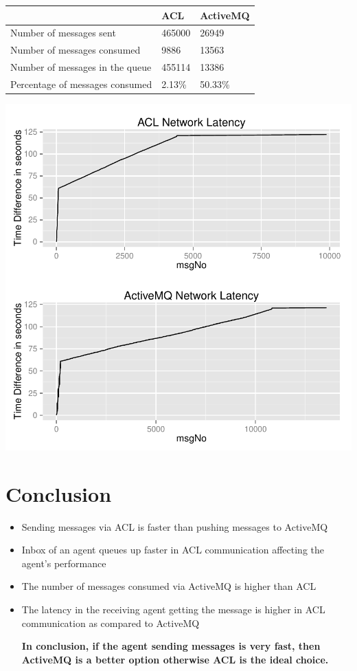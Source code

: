 \documentclass{article}
\begin{document}
\begin{table}[htp]
\begin{center}
\begin{tabular}{|l|l|l|}
\hline
&ACL & ActiveMQ\tabularnewline
\hline
Number of messages sent & 465000 & 26949\tabularnewline
\hline
Number of messages consumed & 9886 & 13563\tabularnewline
\hline
Number of messages in the queue & 455114 & 13386\tabularnewline
\hline
Percentage of messages consumed & 2.13\% & 50.33\%\tabularnewline
\hline
\end{tabular}
\end{center}
\end{table}

\includegraphics{ACLvsActiveMQ_Benchmark-002}
\clearpage

\section{Conclusion}
\begin{itemize}
\item Sending messages via ACL is faster than pushing messages to ActiveMQ
\item Inbox of an agent queues up faster in ACL communication affecting the agent's performance
\item The number of messages consumed via ActiveMQ is higher than ACL
\item The latency in the receiving agent getting the message is higher in ACL communication as compared to ActiveMQ

\textbf{In conclusion, if the agent sending messages is very fast, then ActiveMQ is a better option  otherwise ACL is the ideal choice.}
\end{itemize}
\end{document}
